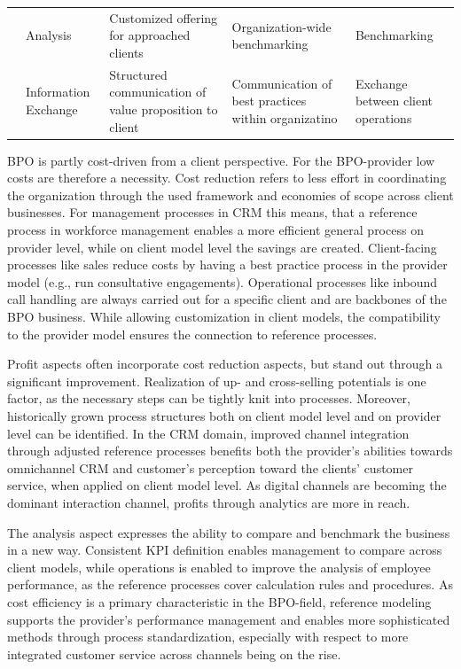 \begin{table}[caption={Benefits of Reference Modelling for BPO-providers in CRM }, label=tab:refmodbpobenefits]
\begin{tabular}{p{1cm} p{2cm} |p{3cm} | p{3cm} | p{3cm} |}
		\multicolumn{1}{|l|}{}                                   & Analysis                            & Customized offering for approached clients              & Organization-wide benchmarking                     & Benchmarking                                                        \\ \cline{2-5} 
		\multicolumn{1}{|l|}{}                                   & Information Exchange                & Structured communication of value proposition to client & Communication of best practices within organizatino & Exchange between client operations                                  \\ \hline
	\end{tabular}
\end{table}

BPO is partly cost-driven from a client perspective. For the BPO-provider low costs are therefore a necessity. Cost reduction refers to less effort in coordinating the organization through the used framework and economies of scope across client businesses. For management processes in CRM this means, that a reference process in workforce management enables a more efficient general process on provider level, while on client model level the savings are created. Client-facing processes like sales reduce costs by having a best practice process in the provider model (e.g., run consultative engagements). Operational processes like inbound call handling are always carried out for a specific client and are backbones of the BPO business. While allowing customization in client models, the compatibility to the provider model ensures the connection to reference processes.

Profit aspects often incorporate cost reduction aspects, but stand out through a significant improvement. Realization of up- and cross-selling potentials is one factor, as the necessary steps can be tightly knit into processes. Moreover, historically grown process structures both on client model level and on provider level can be identified. In the CRM domain, improved channel integration through adjusted reference processes benefits both the provider’s abilities towards omnichannel CRM and customer’s perception toward the clients’ customer service, when applied on client model level. As digital channels are becoming the dominant interaction channel, profits through analytics are more in reach.

The analysis aspect expresses the ability to compare and benchmark the business in a new way. Consistent KPI definition enables management to compare across client models, while operations is enabled to improve the analysis of employee performance, as the reference processes cover calculation rules and procedures. As cost efficiency is a primary characteristic in the BPO-field, reference modeling supports the provider’s performance management and enables more sophisticated methods through process standardization, especially with respect to more integrated customer service across channels being on the rise.

